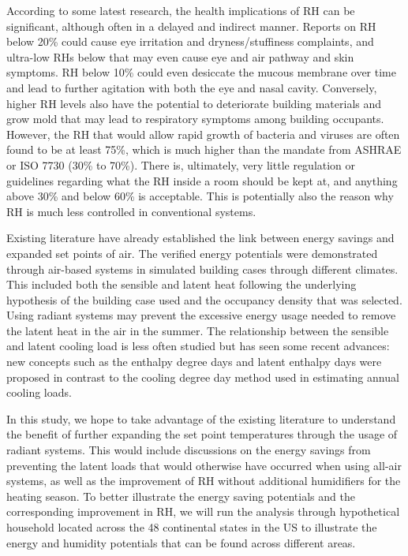 According to some latest research, the health implications of RH can be significant, although often in a delayed and indirect manner. Reports on RH below 20\% could cause eye irritation and dryness/stuffiness complaints, and ultra-low RHs below that may even cause eye and air pathway and skin symptoms. RH below 10\% could even desiccate the mucous membrane over time and lead to further agitation with both the eye and nasal cavity. Conversely, higher RH levels also have the potential to deteriorate building materials and grow mold that may lead to respiratory symptoms among building occupants. However, the RH that would allow rapid growth of bacteria and viruses are often found to be at least 75\%, which is much higher than the mandate from ASHRAE or ISO 7730 (30\% to 70\%). There is, ultimately, very little regulation or guidelines regarding what the RH inside a room should be kept at, and anything above 30\% and below 60\% is acceptable. This is potentially also the reason why RH is much less controlled in conventional systems.

Existing literature have already established the link between energy savings and expanded set points of air. The verified energy potentials were demonstrated through air-based systems in simulated building cases through different climates. This included both the sensible and latent heat following the underlying hypothesis of the building case used and the occupancy density that was selected. Using radiant systems may prevent the excessive energy usage needed to remove the latent heat in the air in the summer. The relationship between the sensible and latent cooling load is less often studied but has seen some recent advances: new concepts such as the enthalpy degree days and latent enthalpy days were proposed in contrast to the cooling degree day method used in estimating annual cooling loads.

In this study, we hope to take advantage of the existing literature to understand the benefit of further expanding the set point temperatures through the usage of radiant systems. This would include discussions on the energy savings from preventing the latent loads that would otherwise have occurred when using all-air systems, as well as the improvement of RH without additional humidifiers for the heating season.  To better illustrate the energy saving potentials and the corresponding improvement in RH, we will run the analysis through hypothetical household located across the 48 continental states in the US to illustrate the energy and humidity potentials that can be found across different areas. 
